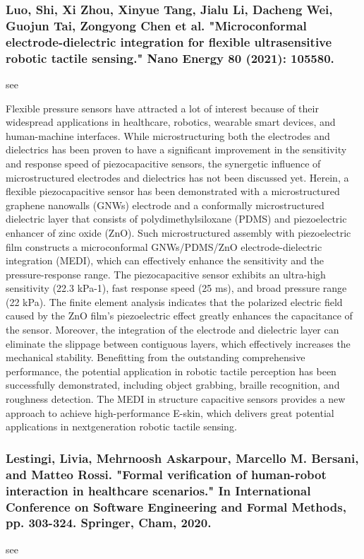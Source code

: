 \documentclass[conference]{IEEEtran}
\begin{document}
\medskip
\subsubsection{Luo, Shi, Xi Zhou, Xinyue Tang, Jialu Li, Dacheng Wei, Guojun Tai, Zongyong Chen et al. "Microconformal electrode-dielectric integration for flexible ultrasensitive robotic tactile sensing." Nano Energy 80 (2021): 105580.}
see \cite{luo2021microconformal}

Flexible pressure sensors have attracted a lot of interest because of their widespread applications in healthcare, robotics, wearable smart devices, and human-machine interfaces. While microstructuring both the electrodes and dielectrics has been proven to have a significant improvement in the sensitivity and response speed of piezocapacitive sensors, the synergetic influence of microstructured electrodes and dielectrics has not been discussed yet. Herein, a flexible piezocapacitive sensor has been demonstrated with a microstructured graphene nanowalls (GNWs) electrode and a conformally microstructured dielectric layer that consists of polydimethylsiloxane (PDMS) and piezoelectric enhancer of zinc oxide (ZnO). Such microstructured assembly with piezoelectric film constructs a microconformal GNWs/PDMS/ZnO electrode-dielectric integration (MEDI), which can effectively enhance the sensitivity and the pressure-response range. The piezocapacitive sensor exhibits an ultra-high sensitivity (22.3 kPa-1), fast response speed (25 ms), and broad pressure range (22 kPa). The finite element analysis indicates that the polarized electric field caused by the ZnO film’s piezoelectric effect greatly enhances the capacitance of the sensor. Moreover, the integration of the electrode and dielectric layer can eliminate the slippage between contiguous layers, which effectively increases the mechanical stability. Benefitting from the outstanding comprehensive performance, the potential application in robotic tactile perception has been successfully demonstrated, including object grabbing, braille recognition, and roughness detection. The MEDI in structure capacitive sensors provides a new approach to achieve high-performance E-skin, which delivers great potential applications in nextgeneration robotic tactile sensing.

\medskip
\subsubsection{Lestingi, Livia, Mehrnoosh Askarpour, Marcello M. Bersani, and Matteo Rossi. "Formal verification of human-robot interaction in healthcare scenarios." In International Conference on Software Engineering and Formal Methods, pp. 303-324. Springer, Cham, 2020.}
see \cite{lestingi2020formal}
\end{document}
